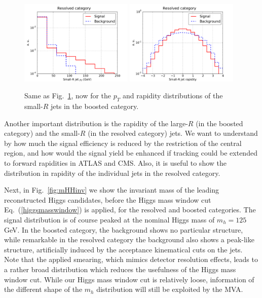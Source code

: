 \begin{figure}[t]
\begin{center}
 \includegraphics[width=0.48\textwidth]{plots/pt_smallRjets_res_noPU.pdf}
 \includegraphics[width=0.48\textwidth]{plots/eta_smallRjets_res_noPU.pdf}
 \caption{\small Same as Fig.~\ref{fig:cutplots23}, now for the
   $p_T$ and rapidity distributions of the small-$R$
   jets in the boosted category.
}
\label{fig:cutplots23}
\end{center}
\end{figure}


Another important distribution is the rapidity of the large-$R$
(in the boosted category) and the small-$R$ (in the resolved
category) jets.
%
We want to understand by how much the signal efficiency is reduced
by the restriction of the central region, and how would
the signal yield be enhanced if tracking could be extended
to forward rapidities in ATLAS and CMS.
%
Also, it is useful to show the distribution in rapidity of the
individual jets in the resolved category.
%

Next, in Fig.~\ref{fig:mHHinv} we show the invariant mass
of the leading reconstructed Higgs candidates, before the Higgs mass window
cut Eq.~(\ref{higgsmasswindow})
  is applied, for the resolved and boosted categories.
%
The signal distribution is of course peaked at the
nominal Higgs mass of $m_h=125$ GeV.
%
In the boosted category, the background shows no particular
structure, while remarkable in the resolved category the background
also shows a peak-like structure, artificially induced by the
acceptance kinematical cuts on the jets.
%
Note that the applied smearing, which mimics detector resolution effects,
leads to a rather broad distribution which reduces the usefulness
of the Higgs mass window cut.
%
While our Higgs mass window cut is relatively loose,
information of the different shape of the $m_{h}$
distribution will still be exploited by the MVA.
%

